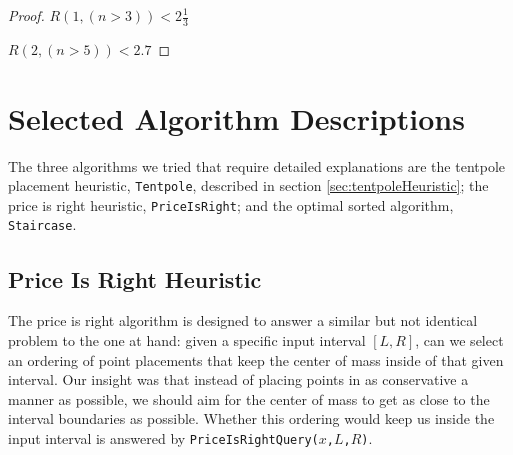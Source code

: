 \begin{proof}
\textbf{$R(1,(n>3)) < 2\frac13$}



\textbf{$R(2,(n>5)) < 2.7$}

\end{proof}

\section{Selected Algorithm Descriptions}

The three algorithms we tried that require detailed explanations are the tentpole placement heuristic,  \texttt{Tentpole}, described in section \ref{sec:tentpoleHeuristic}; the price is right heuristic, \texttt{PriceIsRight}; and the optimal sorted algorithm, \texttt{Staircase}.

\subsection{Price Is Right Heuristic} \label{subs:PIR}

The price is right algorithm is designed to answer a similar but not identical problem to the one at hand: given a specific input interval $[L,R]$, can we select an ordering of point placements that keep the center of mass inside of that given interval.  Our insight was that instead of placing points in as conservative a manner as possible, we should aim for the center of mass to get as close to the interval boundaries as possible.  Whether this ordering would keep us inside the input interval is answered by \texttt{PriceIsRightQuery($x$,$L$,$R$)}.

